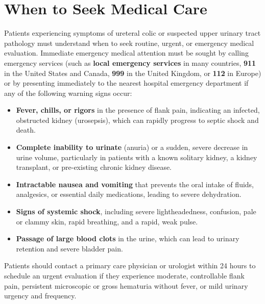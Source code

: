 \section*{When to Seek Medical Care}
Patients experiencing symptoms of ureteral colic or suspected upper urinary tract pathology must understand when to seek routine, urgent, or emergency medical evaluation.
Immediate emergency medical attention must be sought by calling emergency services (such as \textbf{local emergency services} in many countries, \textbf{911} in the United States and Canada, \textbf{999} in the United Kingdom, or \textbf{112} in Europe) or by presenting immediately to the nearest hospital emergency department if any of the following warning signs occur:
\begin{itemize}
\item \textbf{Fever, chills, or rigors} in the presence of flank pain, indicating an infected, obstructed kidney (urosepsis), which can rapidly progress to septic shock and death.
\item \textbf{Complete inability to urinate} (anuria) or a sudden, severe decrease in urine volume, particularly in patients with a known solitary kidney, a kidney transplant, or pre-existing chronic kidney disease.
\item \textbf{Intractable nausea and vomiting} that prevents the oral intake of fluids, analgesics, or essential daily medications, leading to severe dehydration.
\item \textbf{Signs of systemic shock}, including severe lightheadedness, confusion, pale or clammy skin, rapid breathing, and a rapid, weak pulse.
\item \textbf{Passage of large blood clots} in the urine, which can lead to urinary retention and severe bladder pain.
\end{itemize}
Patients should contact a primary care physician or urologist within 24 hours to schedule an urgent evaluation if they experience moderate, controllable flank pain, persistent microscopic or gross hematuria without fever, or mild urinary urgency and frequency.

